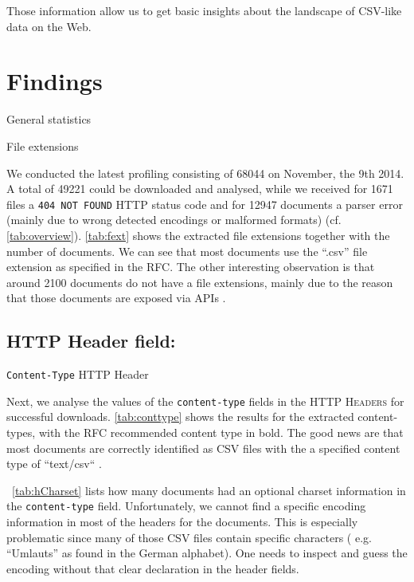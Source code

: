 \documentclass{scrartcl}
\begin{document}
Those information allow us to get basic insights about the landscape of CSV-like data on the Web. 

\section{Findings}
\begin{table}[h]
\centering

\caption{General statistics\label{tab:overview}}
\end{table}

\begin{table}[h]
\centering

\caption{File extensions\label{tab:fext}}
\end{table}
We conducted the latest profiling consisting of 68044 on November, the 9th 2014.
A total of 49221 could be downloaded and analysed, while we received for 1671 files a \texttt{404 NOT FOUND} HTTP status code and for 12947 documents a parser error (mainly due to wrong detected encodings or malformed formats) (cf. \autoref{tab:overview}). \autoref{tab:fext} shows the extracted file extensions together with the number of documents.
We can see that most documents use the ``.csv'' file extension as specified in the RFC. The other interesting observation is that around 2100 documents do not have a file extensions, mainly due to the reason that those documents are exposed via APIs  .


\subsection{HTTP Header field:}
\begin{table}[h]
\centering

\caption{\texttt{Content-Type} \textsc{HTTP} Header\label{tab:conttype}}
\end{table}
Next, we analyse the values of the \texttt{content-type} fields in the \textsc{HTTP Headers} for successful downloads.
\autoref{tab:conttype} shows the results for the extracted content-types, with the RFC recommended content type in bold. 
The good news are that most documents are correctly identified as CSV files with the a specified content type of ``text/csv`` . 

~\autoref{tab:hCharset} lists how many documents had an optional charset information in the \texttt{content-type} field. 
Unfortunately, we cannot find a specific encoding information in most of the headers for the documents. 
This is especially problematic since many of those CSV files contain specific characters ( e.g. ``Umlauts'' as found in the German alphabet). 
One needs to inspect and guess the encoding without that clear declaration in the header fields. 
\end{document}
